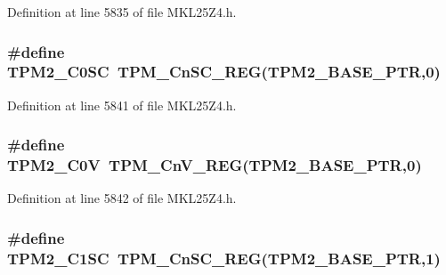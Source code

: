 Definition at line 5835 of file M\+K\+L25\+Z4.\+h.

\subsubsection[{\texorpdfstring{T\+P\+M2\+\_\+\+C0\+SC}{TPM2_C0SC}}]{\setlength{\rightskip}{0pt plus 5cm}\#define T\+P\+M2\+\_\+\+C0\+SC~{\bf T\+P\+M\+\_\+\+Cn\+S\+C\+\_\+\+R\+EG}({\bf T\+P\+M2\+\_\+\+B\+A\+S\+E\+\_\+\+P\+TR},0)}\hypertarget{group___t_p_m___register___accessor___macros_ga785b44d223b8f89fc160d64f25723d4d}{}\label{group___t_p_m___register___accessor___macros_ga785b44d223b8f89fc160d64f25723d4d}


Definition at line 5841 of file M\+K\+L25\+Z4.\+h.

\subsubsection[{\texorpdfstring{T\+P\+M2\+\_\+\+C0V}{TPM2_C0V}}]{\setlength{\rightskip}{0pt plus 5cm}\#define T\+P\+M2\+\_\+\+C0V~{\bf T\+P\+M\+\_\+\+Cn\+V\+\_\+\+R\+EG}({\bf T\+P\+M2\+\_\+\+B\+A\+S\+E\+\_\+\+P\+TR},0)}\hypertarget{group___t_p_m___register___accessor___macros_ga0b447e455db6d97679512216ec7fc076}{}\label{group___t_p_m___register___accessor___macros_ga0b447e455db6d97679512216ec7fc076}


Definition at line 5842 of file M\+K\+L25\+Z4.\+h.

\subsubsection[{\texorpdfstring{T\+P\+M2\+\_\+\+C1\+SC}{TPM2_C1SC}}]{\setlength{\rightskip}{0pt plus 5cm}\#define T\+P\+M2\+\_\+\+C1\+SC~{\bf T\+P\+M\+\_\+\+Cn\+S\+C\+\_\+\+R\+EG}({\bf T\+P\+M2\+\_\+\+B\+A\+S\+E\+\_\+\+P\+TR},1)}\hypertarget{group___t_p_m___register___accessor___macros_gabc1e23b429939450d6b378a09f3d2dd5}{}\label{group___t_p_m___register___accessor___macros_gabc1e23b429939450d6b378a09f3d2dd5}


